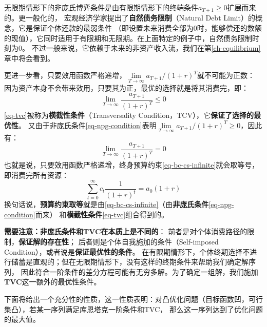 无限期情形下的非庞氏博弈条件是由有限期情形下的终端条件$a_{T+1}\geq 0$扩展而来的。更一般化的，
宏观经济学家提出了\textbf{自然债务限制}（Natural Debt Limit）的概念，它是保证个体还款的最弱条件
（即设置未来消费全部为0时，能够偿还的数额的现值），它同时适用于有限期和无限期。在上面特定的例子中，自然债务限制时刻为0。
不过一般来说，它依赖于未来的非资产收入流，我们在第\ref{ch-equilibrium}章中将会看到。

更进一步看，只要效用函数严格递增，$\lim\limits_{T\rightarrow \infty}a_{T+1}/(1+r)^T$就不可能为正数：
因为资产本身不会带来效用，只要其为正，最优的选择就是将其消费完，即：
\begin{equation}    \label{eq-tvc}
    \lim _{T \rightarrow \infty} \frac{a_{T+1}}{(1+r)^T} \leq 0
\end{equation}
\cref{eq-tvc}被称为\textbf{横截性条件}（Transversality Condition，TCV），它\textbf{保证了选择的最优性}。
又由于非庞氏条件\cref{eq-npg-condition}表明$\lim\limits_{T\rightarrow \infty}a_{T+1}/(1+r)^T\geq 0$，因此有：
\begin{equation}
    \lim _{T \rightarrow \infty} \frac{a_{T+1}}{(1+r)^T} = 0
\end{equation}
也就是说，只要效用函数严格递增，终身预算约束\cref{eq-bc-cs-infinite}就会取等号，即消费完所有资源：
\begin{equation}
    \sum_{t=0}^{\infty} c_t \frac{1}{(1+r)^t}=a_0(1+r)
\end{equation}
换句话说，\textbf{预算约束取等}就是由\cref{eq-bc-cs-infinite}（由\textbf{非庞氏条件}\cref{eq-npg-condition}而来）
和\textbf{横截性条件}\cref{eq-tvc}组合得到的。

\textbf{需要注意：非庞氏条件和TVC在本质上是不同的}：
前者是对个体消费路径的限制，\textbf{保证解的存在性}；
后者则是个体自我施加的条件（Self-imposed Condition），或者说是\textbf{保证最优性的条件}。
在有限期情形下，个体终期选择不进行储蓄是直观的；但在无限期情形下，没有这样的终期条件来帮助我们确定解序列，
因此符合一阶条件的差分方程可能有无穷多解。为了确定一组解，我们施加\textbf{TVC}这一额外的最优性条件。

下面将给出一个充分性的性质，这一性质表明：对凸优化问题（目标函数凹，可行集凸），若某一序列满足库恩塔克一阶条件和TVC，
那么这一序列达到了优化问题的最大值。

